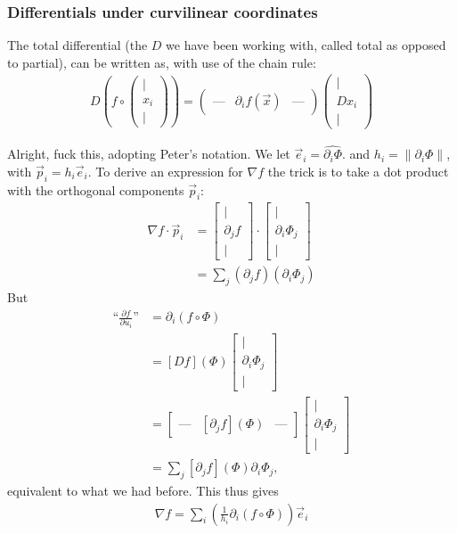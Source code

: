 \documentclass{article}
\theoremstyle{definition}
\begin{document}
\subsubsection{Differentials under curvilinear coordinates}
The total differential (the $D$ we have been working with, called total as opposed to partial), can be written as, with use of the chain rule:
\begin{align*}
	D\left(f\circ \begin{pmatrix}\mid\\x_i\\\mid\end{pmatrix}\right)=\begin{pmatrix}\text{---}&\partial_if(\vec x)&\text{---}\end{pmatrix}\begin{pmatrix}\mid\\Dx_i\\\mid\end{pmatrix}
\end{align*}

Alright, fuck this, adopting Peter's notation. We let $\vec e_i=\hat{\partial_i\Phi}$. and $h_i=\left\lVert\partial_i\Phi\right\rVert$, with $\vec p_i=h_i\vec e_i$. To derive an expression for $\nabla f$ the trick is to take a dot product with the orthogonal components $\vec p_i$:
\begin{align*}
	\nabla f\cdot \vec p_i&=\begin{bmatrix}\mid\\\partial_jf\\\mid\end{bmatrix}\cdot\begin{bmatrix}\mid\\\partial_i\Phi_j\\\mid\end{bmatrix}\\
	&=\sum_j(\partial_jf)(\partial_i\Phi_j)
\end{align*}
But
\begin{align*}
	\text{``}\frac{\partial f}{\partial u_i}\text{''}&=\partial_i(f\circ\Phi)\\
	&=[Df](\Phi)\begin{bmatrix}\mid\\\partial_i\Phi_j\\\mid\end{bmatrix}\\
	&=\begin{bmatrix}\text{---}&[\partial_jf](\Phi)&\text{---}\end{bmatrix}\begin{bmatrix}\mid\\\partial_i\Phi_j\\\mid\end{bmatrix}\\
	&=\sum_j[\partial_jf](\Phi)\partial_i\Phi_j,
\end{align*}
equivalent to what we had before. This thus gives
\begin{align*}
	\nabla f=\sum_i\left(\frac{1}{h_i}\partial_i(f\circ\Phi)\right)\vec e_i
\end{align*}
\end{document}
